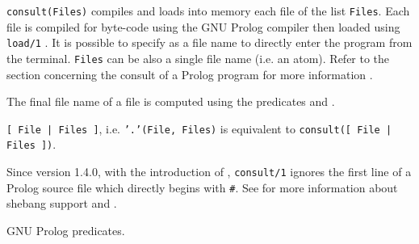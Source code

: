 \Description

\texttt{consult(Files)} compiles and loads into memory each file
of the list \texttt{Files}. Each file is compiled for byte-code using the
GNU Prolog compiler  then loaded using
\texttt{load/1} . It is possible to specify  as a
file name to directly enter the program from the terminal. \texttt{Files} can
be also a single file name (i.e. an atom). Refer to the section concerning
the consult of a Prolog program for more information
.

The final file name of a file is computed using the predicates
  and
 .

\texttt{[ File | Files ]}, i.e. \texttt{'.'(File, Files)} is
equivalent to \texttt{consult([ File | Files ])}.

Since version 1.4.0, with the introduction of ,
\texttt{consult/1} ignores the first line of a Prolog source file which
directly begins with \texttt{\#}. See
 for more information about
shebang support and .

\begin{PlErrors}







\end{PlErrors}

\Portability

GNU Prolog predicates.

